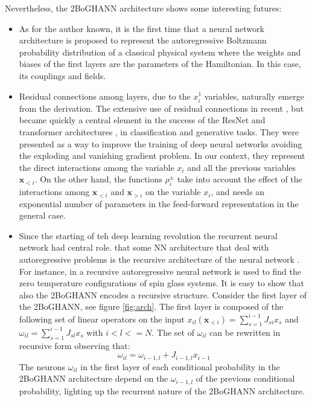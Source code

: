 \documentclass[aps,physrev,10pt,floatfix,longbibliography,nofootinbib,reprint]{revtex4-2}
\begin{document}
 Nevertheless, the 2BoGHANN architecture shows some interesting futures:
\begin{itemize}
    \item As for the author known, it is the first time that a neural network architecture is proposed to represent the autoregressive Boltzmann probability distribution of a classical physical system where the weights and biases of the first layers are the parameters of the Hamiltonian. In this case, its couplings and fields. 
    \item Residual connections among layers, due to the $x_i^1$ variables, naturally emerge from the derivation. 
    The extensive use of residual connections in recent \cite{10.48550/arxiv.1512.03385}, but became quickly a central element in the success of the ResNet and transformer architectures \cite{vaswani2017attention}, in classification and generative tasks. They were presented as a way to improve the training of deep neural networks avoiding the exploding and vanishing gradient problem. In our context, they represent the direct interactions among the variable $x_i$ and all the previous variables $\mathbf{x}_{<i}$. 
    On the other hand, the functions $\rho_i^{\pm}$ take into account the effect of the interactions among $\mathbf{x}_{<i}$ and $\mathbf{x}_{>i}$ on the variable $x_i$, and needs an exponential number of parameters in the feed-forward representation in the general case. 
    \item Since the starting of teh deep learning revolution the recurrent neural network had central role. that some NN architecture that deal with autoregressive problems is the recursive architecture of the neural network \cite{bengioNatureDeepLearning2015}. 
    For instance, in \cite{10.1038/s42256-021-00401-3} a recursive autoregressive neural network is used to find the zero temperature configurations of spin glass systems. 
    It is easy to show that also the 2BoGHANN encodes a recursive structure. 
    Consider the first layer of the 2BoGHANN, see figure \ref{fig:arch}. The first layer is composed of the following set of linear operators on the input $x_{il}(\mathbf{x}_{<i})=\sum_{s=1}^{i-1} J_{si} x_s$ and $\omega_{il}=\sum_{s=1}^{i-1} J_{sl} x_s$ with $i<l<=N$. 
    The set of $\omega_{il}$ can be rewritten in recursive form observing that:
    \begin{equation}
    \omega_{il} = \omega_{i-1,l} + J_{i-1,l} x_{i-1}
    \end{equation}
    The neurons $\omega_{il}$ in the first layer of each conditional probability in the 2BoGHANN architecture depend on the $\omega_{i-1,l}$ of the previous conditional probability, lighting up the recurrent nature of the 2BoGHANN architecture.
\end{itemize}
\end{document}
